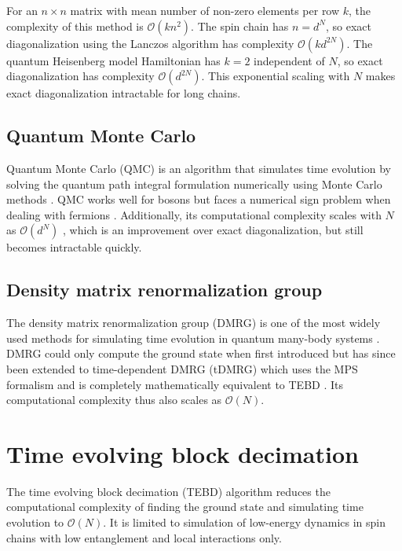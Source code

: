 \documentclass[a4paper, headsepline, footheight=13.6pt]{scrartcl}
\begin{document}
For an {$n \times n$} matrix with mean number of non-zero elements per row $k$, the complexity of this method is $\mathcal{O}\left(kn^2\right)$. The spin chain has $n=d^N$, so exact diagonalization using the Lanczos algorithm has complexity $\mathcal{O}\left(kd^{2N}\right)$. The quantum Heisenberg model Hamiltonian has $k=2$ independent of $N$, so exact diagonalization has complexity $\mathcal{O}\left(d^{2N}\right)$. This exponential scaling with $N$ makes exact diagonalization intractable for long chains.

\subsection{Quantum Monte Carlo}
Quantum Monte Carlo (QMC) is an algorithm that simulates time evolution by solving the quantum path integral formulation numerically using Monte Carlo methods \cite{Barker:1979aa}. QMC works well for bosons but faces a numerical sign problem when dealing with fermions \cite{Dornheim:2019aa}. Additionally, its computational complexity scales with $N$ as $\mathcal{O}\left(d^N\right)$ \cite{Buividovich_2023}, which is an improvement over exact diagonalization, but still becomes intractable quickly.

\subsection{Density matrix renormalization group}
The density matrix renormalization group (DMRG) is one of the most widely used methods for simulating time evolution in quantum many-body systems \cite{Verstraete:2023aa}. DMRG could only compute the ground state when first introduced \cite{White:1992aa} but has since been extended to time-dependent DMRG (tDMRG) which uses the MPS formalism and is completely mathematically equivalent to TEBD \cite{Schollwoeck_2011}. Its computational complexity thus also scales as $\mathcal{O}(N)$.

\section{Time evolving block decimation}
The time evolving block decimation (TEBD) algorithm \cite{Vidal:2004aa} reduces the computational complexity of finding the ground state and simulating time evolution to $\mathcal{O}(N)$. It is limited to simulation of low-energy dynamics in spin chains with low entanglement and local interactions only.
\end{document}
